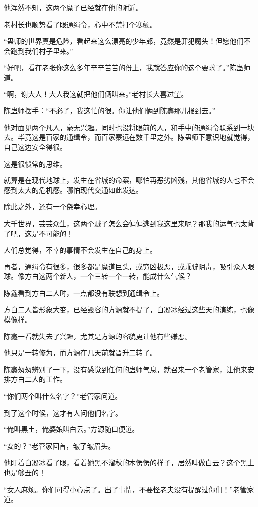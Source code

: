 \begin{this_body}
他浑然不知，这两个魔子已经就在他的附近。

老村长也顺势看了眼通缉令，心中不禁打个寒颤。

“蛊师的世界真是危险，看起来这么漂亮的少年郎，竟然是罪犯魔头！但愿他们不会跑到我们村子里来。”

“好吧，看在老张你这么多年辛辛苦苦的份上，我就答应你的这个要求了。”陈蛊师道。

“啊，谢大人！大人我这就把他们俩叫来。”老村长大喜过望。

陈蛊师摆手：“不必了，我这忙的很。你让他们俩到陈鑫那儿报到去。”

他对面见两个凡人，毫无兴趣。同时也没将眼前的人，和手中的通缉令联系到一块去。毕竟这是百家的通缉令，而百家寨远在数千里之外。陈蛊师下意识地就觉得，自己这边安全得很。

这是很惯常的思维。

就算是在现代地球上，发生在省城的命案，哪怕再恶劣凶残，其他省城的人也不会感到太大的危机感。哪怕现代交通如此发达。

除此之外，还有一个侥幸心理。

大千世界，芸芸众生，这两个贼子怎么会偏偏逃到我这里来呢？那我的运气也太背了吧，这是不可能的！

人们总觉得，不幸的事情不会发生在自己的身上。

再者，通缉令有很多，很多都是魔道巨头，或穷凶极恶，或乖僻阴毒，吸引众人眼球。像方白这两个新人，一个三转一个一转，能成什么气候？

陈鑫看到方白二人时，一点都没有联想到通缉令上。

方白二人皆形象大变，已经毁容的方源就不提了，白凝冰经过这些天的演练，也像模像样。

陈鑫一看就失去了兴趣，尤其是方源的容貌更让他有些嫌恶。

他只是一转修为，而方源在几天前就晋升二转了。

陈鑫匆匆辨别了一下，没有感觉到任何的蛊师气息，就召来一个老管家，让他来安排方白二人的工作。

“你们两个叫什么名字？”老管家问道。

到了这个时候，这才有人问他们名字。

“俺叫黑土，俺婆娘叫白云。”方源随口便道。

“女的？”老管家回首，皱了皱眉头。

他盯着白凝冰看了眼，看着她黑不溜秋的木愣愣的样子，居然叫做白云？这个黑土也是够丑的！

“女人麻烦。你们可得小心点了。出了事情，不要怪老夫没有提醒过你们！”老管家道。


\end{this_body}
